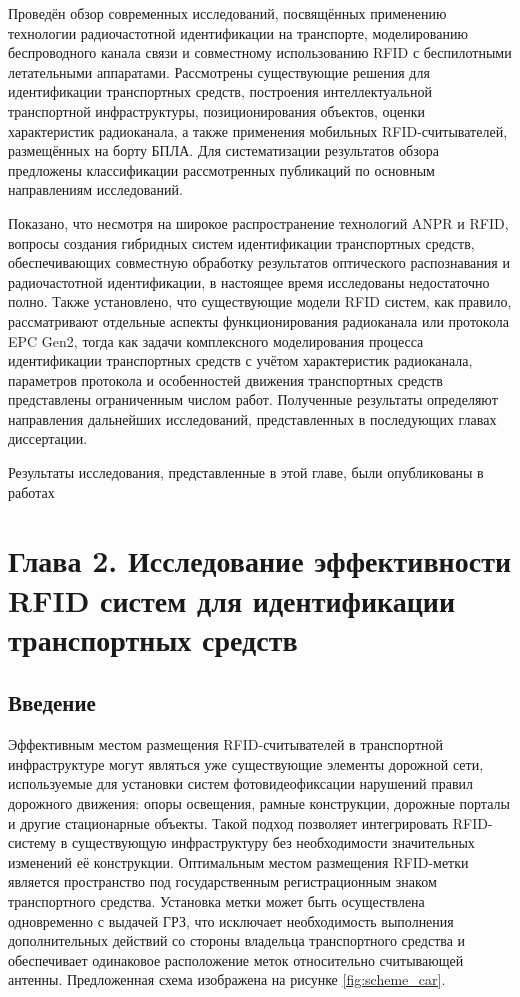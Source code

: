 \documentclass[12pt]{article}
\theoremstyle{definition}
\begin{document}
Проведён обзор современных исследований, посвящённых применению технологии радиочастотной идентификации на транспорте, моделированию беспроводного канала связи и совместному использованию RFID с беспилотными летательными аппаратами. Рассмотрены существующие решения для идентификации транспортных средств, построения интеллектуальной транспортной инфраструктуры, позиционирования объектов, оценки характеристик радиоканала, а также применения мобильных RFID-считывателей, размещённых на борту БПЛА. Для систематизации результатов обзора предложены классификации рассмотренных публикаций по основным направлениям исследований.

Показано, что несмотря на широкое распространение технологий ANPR и RFID, вопросы создания гибридных систем идентификации транспортных средств, обеспечивающих совместную обработку результатов оптического распознавания и радиочастотной идентификации, в настоящее время исследованы недостаточно полно. Также установлено, что существующие модели RFID систем, как правило, рассматривают отдельные аспекты функционирования радиоканала или протокола EPC Gen2, тогда как задачи комплексного моделирования процесса идентификации транспортных средств с учётом характеристик радиоканала, параметров протокола и особенностей движения транспортных средств представлены ограниченным числом работ. Полученные результаты определяют направления дальнейших исследований, представленных в последующих главах диссертации. 

Результаты исследования, представленные в этой главе, были опубликованы
в работах \cite{Abramian2024, Abramian2024DCCN}

\pagebreak

\section{Глава 2. Исследование эффективности RFID систем для идентификации транспортных средств}
\label{sec:ch2}

\subsection{Введение}
\label{sec:ch21}

Эффективным местом размещения RFID-считывателей в транспортной инфраструктуре могут являться уже существующие элементы дорожной сети, используемые для установки систем фотовидеофиксации нарушений правил дорожного движения: опоры освещения, рамные конструкции, дорожные порталы и другие стационарные объекты. Такой подход позволяет интегрировать RFID-систему в существующую инфраструктуру без необходимости значительных изменений её конструкции. Оптимальным местом размещения RFID-метки является пространство под государственным регистрационным знаком транспортного средства. Установка метки может быть осуществлена одновременно с выдачей ГРЗ, что исключает необходимость выполнения дополнительных действий со стороны владельца транспортного средства и обеспечивает одинаковое расположение меток относительно считывающей антенны. Предложенная схема изображена на рисунке \ref{fig:scheme_car}. %
\end{document}
